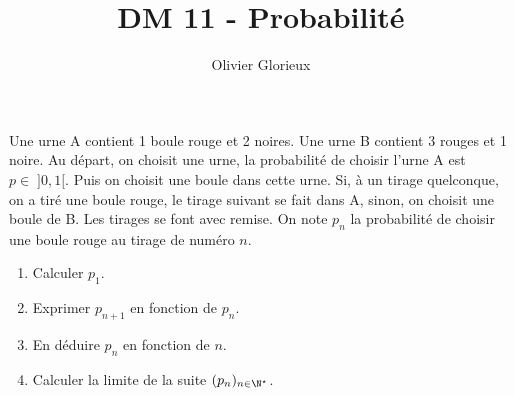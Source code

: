 \documentclass[a4paper, 11pt,reqno]{article}
\author{Olivier Glorieux}
\begin{document}
\title{DM 11 - Probabilité }






\begin{exercice}   \;
Une urne A contient 1 boule rouge et 2 noires. Une urne B contient 3 rouges et 1 noire. Au d\'epart, on choisit une urne, la probabilit\'e de choisir l'urne A est $p\in \; \rbrack 0,1\lbrack$. Puis on choisit une boule dans cette urne. Si, \`a un tirage quelconque, on a tir\'e une boule rouge, le tirage suivant se fait dans A, sinon, on choisit une boule de B. Les tirages se font avec remise. On note $p_n$ la probabilit\'e de choisir une boule rouge au tirage de num\'ero $n$.
\begin{enumerate}
\item  Calculer $p_1$.
\item Exprimer $p_{n+1}$ en fonction de $p_n$.
\item  En d\'eduire $p_n$ en fonction de $n$.
\item  Calculer la limite de la suite $(p_n)_{n\in\N^{\star}}$.
\end{enumerate} 
\end{exercice}
\end{document}

